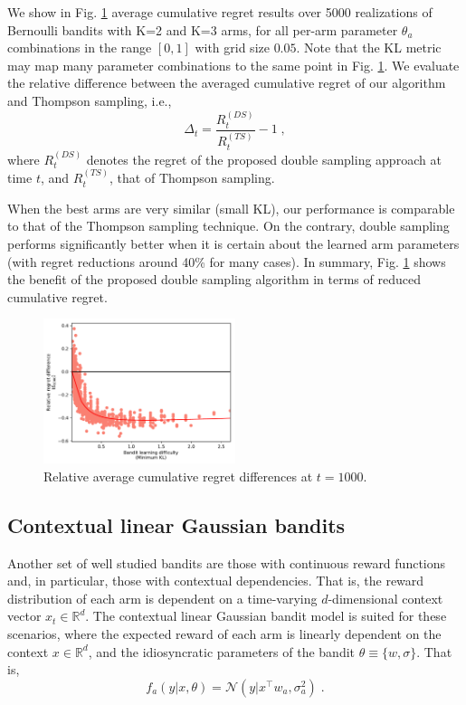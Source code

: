 \documentclass[10pt]{article}
\def \Real{{\mathbb R}}
\newcommand{\ie}{i.e., }
\newcommand{\N}{\mathcal{N}}
\begin{document}
We show in Fig. \ref{fig:bernoulli_relative_cumregret_kl} average cumulative regret results over 5000 realizations of Bernoulli bandits with K=2 and K=3 arms, for all per-arm parameter $\theta_a$ combinations in the range $[0,1]$ with grid size $0.05$. Note that the KL metric may map many parameter combinations to the same point in Fig. \ref{fig:bernoulli_relative_cumregret_kl}. We evaluate the relative difference between the averaged cumulative regret of our algorithm and Thompson sampling, \ie
\begin{equation}
\Delta_t =\frac{R_{t}^{(DS)}}{R_{t}^{(TS)}}-1 \; ,
\label{eq:relative_cum_reg_dif}
\end{equation}
where $R_t^{(DS)}$ denotes the regret of the proposed double sampling approach at time $t$, and $R_t^{(TS)}$, that of Thompson sampling.

When the best arms are very similar (small KL), our performance is comparable to that of the Thompson sampling technique. On the contrary, double sampling performs significantly better when it is certain about the learned arm parameters (with regret reductions around 40\% for many cases). In summary, Fig. \ref{fig:bernoulli_relative_cumregret_kl} shows the benefit of the proposed double sampling algorithm in terms of reduced cumulative regret.

\begin{figure}[!h]
	\centering
	\includegraphics[width=0.5\textwidth]{./figs/bernoulli/min_KL_relDiff_t1000_07.pdf}
	\caption{Relative average cumulative regret differences at $t=1000$.}
	\label{fig:bernoulli_relative_cumregret_kl}
\end{figure}

\subsection{Contextual linear Gaussian bandits}
\label{ssec:contextLinearGaussian_bandits}

Another set of well studied bandits are those with continuous reward functions and, in particular, those with contextual dependencies. That is, the reward distribution of each arm is dependent on a time-varying $d$-dimensional context vector $x_t\in\Real^{d}$. The contextual linear Gaussian bandit model is suited for these scenarios, where the expected reward of each arm is linearly dependent on the context $x\in\Real^{d}$, and the idiosyncratic parameters of the bandit $\theta\equiv\{w, \sigma\}$. That is,
\begin{equation}
f_a(y|x,\theta)=\N(y|x^\top w_a, \sigma_a^2) \; .
\end{equation}
\end{document}

